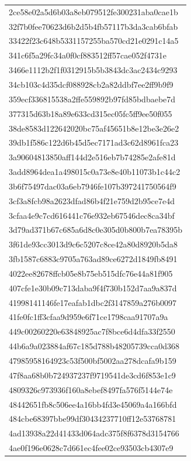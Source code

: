\begin{tabular}{l}
2ce58e02a5d6b03a8eb079512fe300231aba0cae1b \\
32f7b0fee70623d6b2d5b4fb57117b3da3cab6bfab \\
33422f23c648b5331157255ba570cd21e0291c14a5 \\
341c6f5a29fc34a0f0cf883512ff57cae052f4731e \\
3466e1112b2f1f0312915b5b3843dc3ac2434c9293 \\
34cb103c4d35dcf088928cb2a82ddbf7ee2ff9b9f9 \\
359ecf336815538a2ffe559892b97fd85bdbaebe7d \\
377315d63b18a89e633cd315ec05fc5ff9ee50f055 \\
38de8583d122642020bc75af45651b8e12be3e26e2 \\
39db1f586c122d6b45d5ec7171ad3c62d8961fca23 \\
3a90604813850aff144d2e516eb7b74285e2afe81d \\
3add8964dea1a498015c0a73e8e40b11073b1c44c2 \\
3b6f75497dac03a6eb7946fe107b397241750564f9 \\
3cf3a8fcb98a2623dfad86b4f21e759d2b95ce7e4d \\
3cfaa4e9c7cd616441c76e932eb67546dec8ca34bf \\
3d79ad371b67c685a6d8c0e305d0b800b7ea78395b \\
3f61de93cc3013d9c6c5207c8ce42a80d8920b5da8 \\
3fb1587c6883c9705a763ad89ce6272d1849fb8491 \\
4022ee82678ffcb05e8b75eb515dfc76e44a81f905 \\
407cfe1e30b09c713daba9f4f730b152d7aa9a837d \\
41998141146fe17eafab1dbc2f3147859a276b0097 \\
41fe0fc1ff3cfaa9d959e6f71ce1798caa91707a9a \\
449c00260220e63848925ac7f8bce6d4dfa33f2550 \\
44b6a9a023884af67c185d788b48205739cca0d368 \\
47985958164923c53f500bf5002aa278dcafa9b159 \\
47f8aa68b0b724937237f9719541de3cd6f853e1c9 \\
4809326c973936f160a8ebef8497fa576f5144e74e \\
48442651fb8c506ee4a16bb4fd3e45069a4a166bfd \\
484cbe68397bbe99df30434237710ff12e53768781 \\
4ad13938a22d41433d064adc375f8f6378d3154766 \\
4ae0f196e0628c7d661ec4fee02ce93503cb4307e9 \\

\end{tabular}
